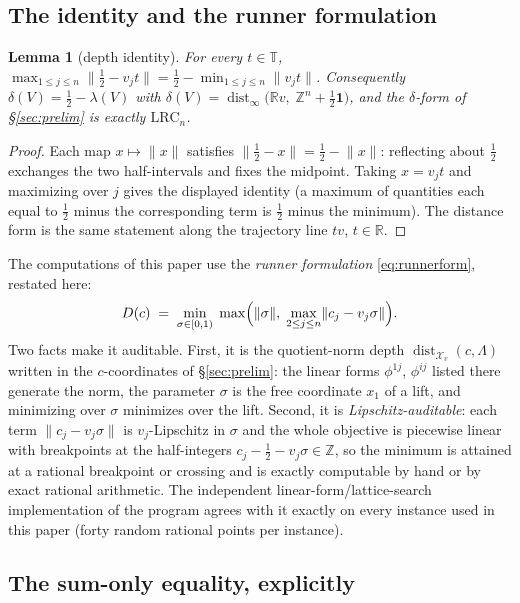 \documentclass[11pt,a4paper]{article}
\numberwithin{equation}{section}
\theoremstyle{plain}
\newtheorem{lemma}[theorem]{Lemma}
\theoremstyle{definition}
\theoremstyle{remark}
\newcommand{\Z}{\mathbb{Z}}
\newcommand{\R}{\mathbb{R}}
\newcommand{\T}{\mathbb{T}}
\newcommand{\wnc}[1]{\lVert #1 \rVert}
\newcommand{\lrc}{\mathrm{LRC}}
\begin{document}
\subsection{The identity and the runner formulation}

\begin{lemma}[depth identity]\label{lem:depthid}
For every $t\in\T$,
$\max_{1\le j\le n}\wnc{\tfrac12-v_jt}=\tfrac12-\min_{1\le j\le n}\wnc{v_jt}$.
Consequently $\delta(V)=\tfrac12-\lambda(V)$ with
$\delta(V)=\operatorname{dist}_\infty\!\bigl(\R v,\;\Z^n+\tfrac12\mathbf{1}
\bigr)$, and the $\delta$-form of \S\ref{sec:prelim} is exactly
$\lrc_n$.
\end{lemma}

\begin{proof}
Each map $x\mapsto\wnc{x}$ satisfies
$\wnc{\tfrac12-x}=\tfrac12-\wnc{x}$: reflecting about $\tfrac12$
exchanges the two half-intervals and fixes the midpoint. Taking $x=v_jt$
and maximizing over $j$ gives the displayed identity (a maximum of
quantities each equal to $\tfrac12$ minus the corresponding term is
$\tfrac12$ minus the minimum). The distance form is the same statement
along the trajectory line $tv$, $t\in\R$.
\end{proof}

The computations of this paper use the \emph{runner formulation}
\eqref{eq:runnerform}, restated here:
\[
D(c)\;=\;\min_{\sigma\in[0,1)}\;\max\Bigl(\wnc{\sigma},\;
\max_{2\le j\le n}\wnc{c_j-v_j\sigma}\Bigr).
\]
Two facts make it auditable. First, it is the quotient-norm depth
$\operatorname{dist}_{\mathcal{X}_v}(c,\Lambda)$ written in the
$c$-coordinates of \S\ref{sec:prelim}: the linear forms $\phi^{1j}$,
$\phi^{ij}$ listed there generate the norm, the parameter $\sigma$ is the
free coordinate $x_1$ of a lift, and minimizing over $\sigma$ minimizes
over the lift. Second, it is \emph{Lipschitz-auditable}: each term
$\wnc{c_j-v_j\sigma}$ is $v_j$-Lipschitz in $\sigma$ and the whole
objective is piecewise linear with breakpoints at the half-integers
$c_j-\tfrac12-v_j\sigma\in\Z$, so the minimum is attained at a rational
breakpoint or crossing and is exactly computable by hand or by exact
rational arithmetic. The independent linear-form/lattice-search
implementation of the program agrees with it exactly on every instance
used in this paper (forty random rational points per instance).

\subsection{The sum-only equality, explicitly}
\end{document}
